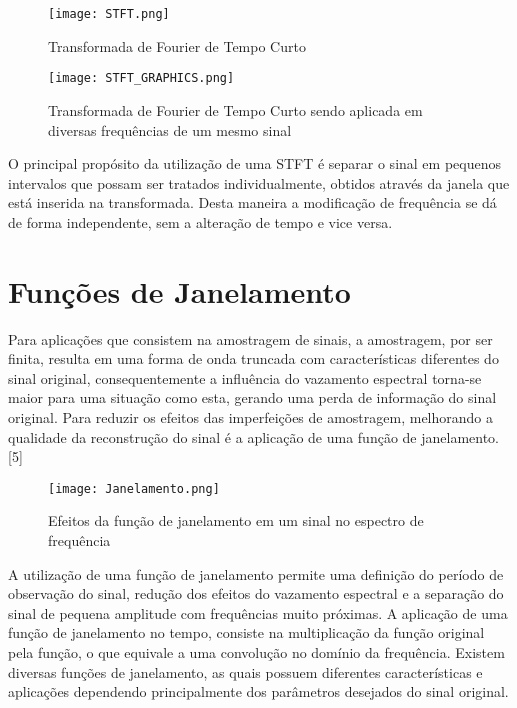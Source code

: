 \begin{figure}[h]
	\centering
	\texttt{[image: STFT.png]}
	\label{fig:STFT}
	\caption{Transformada de Fourier de Tempo Curto}
\end{figure}

\begin{figure}[h]
	\centering
	\texttt{[image: STFT\_GRAPHICS.png]}
	\label{fig:STFT_GRAPHICS}
	\caption{Transformada de Fourier de Tempo Curto sendo aplicada em diversas frequências de um mesmo sinal}
\end{figure}
 
O principal propósito da utilização de uma STFT é separar o sinal em pequenos intervalos que possam ser tratados individualmente, obtidos através da janela que está inserida na transformada. Desta maneira a modificação de frequência se dá de forma independente, sem a alteração de tempo e vice versa. 

\section*{Funções de Janelamento}
Para aplicações que consistem na amostragem de sinais, a amostragem, por ser finita, resulta em uma forma de onda truncada com características diferentes do sinal original, consequentemente a influência do vazamento espectral torna-se maior para uma situação como esta, gerando uma perda de informação do sinal original. 
Para reduzir os efeitos das imperfeições de amostragem, melhorando a qualidade da reconstrução do sinal é a aplicação de uma função de janelamento.[5]

\begin{figure}[h]
	\centering
	\texttt{[image: Janelamento.png]}
	\label{fig:Janelamento}
	\caption{Efeitos da função de janelamento em um sinal no espectro de frequência}
\end{figure}
 \newpage

A utilização de uma função de janelamento permite uma definição do período de observação do sinal, redução dos efeitos do vazamento espectral e a separação do sinal de pequena amplitude com frequências muito próximas. A aplicação de uma função de janelamento no tempo, consiste na multiplicação da função original pela função, o que equivale a uma convolução no domínio da frequência.
Existem diversas funções de janelamento, as quais possuem diferentes características e aplicações dependendo principalmente dos parâmetros desejados do sinal original.


